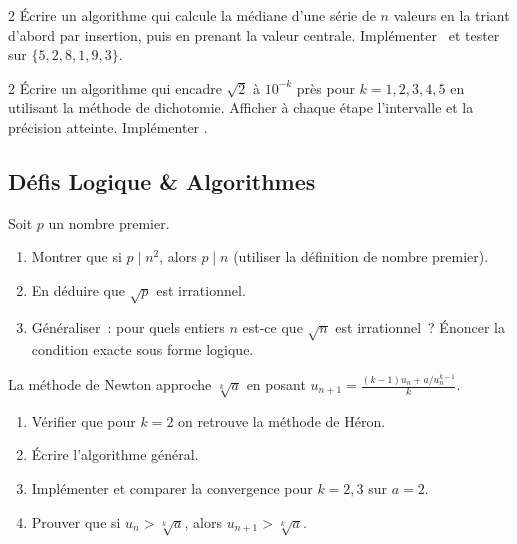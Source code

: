 \begin{bilan}
\begin{probleme}{2}
\'Ecrire un algorithme qui calcule la m\'ediane d'une s\'erie de $n$ valeurs
en la triant d'abord par insertion, puis en prenant la valeur centrale.
Impl\'ementer \computer\ et tester sur $\{5,2,8,1,9,3\}$.
\end{probleme}

\begin{probleme}{2}
\'Ecrire un algorithme qui encadre $\sqrt{2}$ \`a $10^{-k}$ pr\`es
pour $k=1,2,3,4,5$ en utilisant la m\'ethode de dichotomie.
Afficher \`a chaque \'etape l'intervalle et la pr\'ecision atteinte.
Impl\'ementer \computer.
\end{probleme}

\subsection*{D\'efis Logique \& Algorithmes}

\begin{challenge}
Soit $p$ un nombre premier.
\begin{enumerate}
  \item Montrer que si $p\mid n^2$, alors $p\mid n$
        (utiliser la d\'efinition de nombre premier).
  \item En d\'eduire que $\sqrt{p}$ est irrationnel.
  \item G\'en\'eraliser~: pour quels entiers $n$ est-ce que $\sqrt{n}$ est irrationnel~?
        \'Enoncer la condition exacte sous forme logique.
\end{enumerate}
\end{challenge}

\begin{challenge}
La m\'ethode de Newton approche $\sqrt[k]{a}$ en posant $u_{n+1}=\frac{(k-1)u_n+a/u_n^{k-1}}{k}$.
\begin{enumerate}
  \item V\'erifier que pour $k=2$ on retrouve la m\'ethode de H\'eron.
  \item \'Ecrire l'algorithme g\'en\'eral.
  \item Impl\'ementer et comparer la convergence pour $k=2,3$ sur $a=2$.
  \item Prouver que si $u_n>\sqrt[k]{a}$, alors $u_{n+1}>\sqrt[k]{a}$.
\end{enumerate}
\end{challenge}

\end{bilan}



